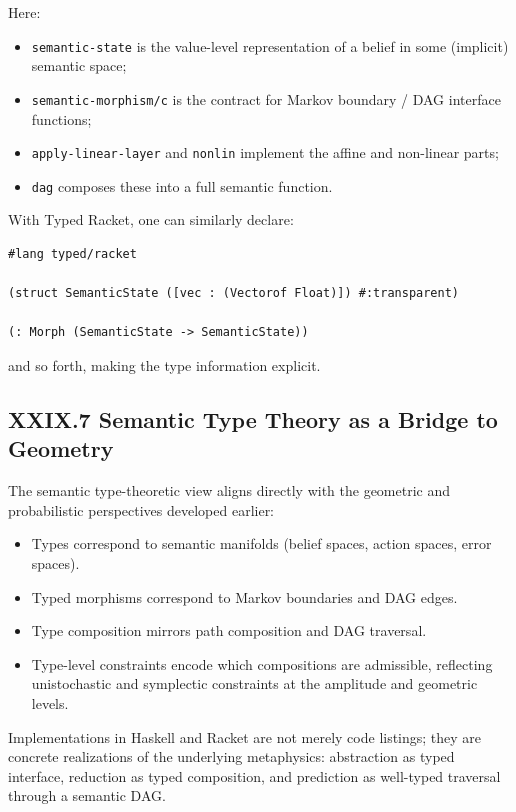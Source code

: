 \documentclass[11pt,letterpaper]{article}
\begin{document}
Here:

\begin{itemize}
  \item \verb|semantic-state| is the value-level representation of a belief in some (implicit) semantic space;
  \item \verb|semantic-morphism/c| is the contract for Markov boundary / DAG interface functions;
  \item \verb|apply-linear-layer| and \verb|nonlin| implement the affine and non-linear parts;
  \item \verb|dag| composes these into a full semantic function.
\end{itemize}

With Typed Racket, one can similarly declare:

\begin{verbatim}
#lang typed/racket

(struct SemanticState ([vec : (Vectorof Float)]) #:transparent)

(: Morph (SemanticState -> SemanticState))
\end{verbatim}

and so forth, making the type information explicit.

\subsection{XXIX.7 Semantic Type Theory as a Bridge to Geometry}

The semantic type-theoretic view aligns directly with the geometric and probabilistic perspectives developed earlier:

\begin{itemize}
  \item Types correspond to semantic manifolds (belief spaces, action spaces, error spaces).
  \item Typed morphisms correspond to Markov boundaries and DAG edges.
  \item Type composition mirrors path composition and DAG traversal.
  \item Type-level constraints encode which compositions are admissible, reflecting unistochastic and symplectic constraints at the amplitude and geometric levels.
\end{itemize}

Implementations in Haskell and Racket are not merely code listings; they are concrete realizations of the underlying metaphysics: abstraction as typed interface, reduction as typed composition, and prediction as well-typed traversal through a semantic DAG.
\end{document}
